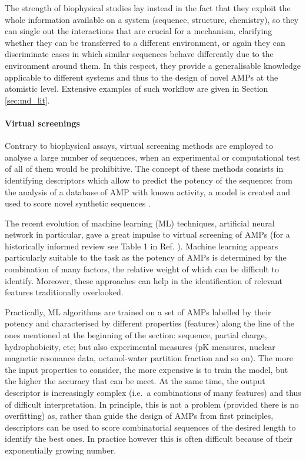The strength of biophysical studies lay instead in the fact that they exploit the whole information available on a system (sequence, structure, chemistry), so they can single out the interactions that are crucial for a mechanism, clarifying whether they can be transferred to a different environment, or again they can discriminate cases in which similar sequences behave differently due to the environment around them. In this respect, they provide a generalisable knowledge applicable to different systems and thus to the design of novel AMPs at the atomistic level. Extensive examples of such workflow are given in Section \ref{sec:md_lit}.

\paragraph{Virtual screenings}
Contrary to biophysical assays, virtual screening methods are employed to analyse a large number of sequences, when an experimental or computational test of all of them would be prohibitive. The concept of these methods consists in identifying descriptors which allow to predict the potency of the sequence: from the analysis of a database of AMP with known activity, a model is created and used to score novel synthetic sequences \citep{Fjell2011,Kleandrova2016}.

The recent evolution of machine learning (ML) techniques, artificial neural network in particular, gave a great impulse to virtual screening of AMPs (for a historically informed review see Table 1 in Ref. \citep{Fjell2011,Veltri2018}). Machine learning appears particularly suitable to the task as the potency of AMPs is determined by the combination of many factors, the relative weight of which can be difficult to identify. Moreover, these approaches can help in the identification of relevant features traditionally overlooked.

Practically, ML algorithms are trained on a set of AMPs labelled by their potency and characterised by different properties (features) along the line of the ones mentioned at the beginning of the section: sequence, partial charge, hydrophobicity, etc; but also experimental measures (pK measures, nuclear magnetic resonance data, octanol-water partition fraction and so on).
%
The more the input properties to consider, the more expensive is to train the model, but the higher the accuracy that can be meet. At the same time, the output descriptor is increasingly complex (i.e.\ a combinations of many features) and thus of difficult interpretation.
%
In principle, this is not a problem (provided there is no overfitting) as, rather than guide the design of AMPs from first principles, descriptors can be used to score combinatorial sequences of the desired length to identify the best ones. In practice however this is often difficult because of their exponentially growing number.

